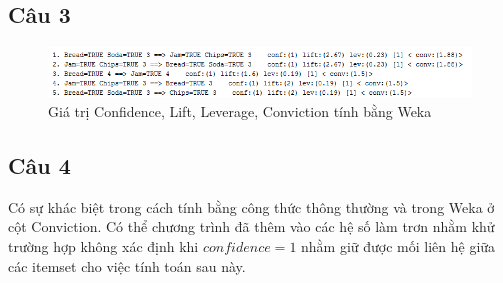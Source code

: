 \documentclass{article}
\begin{document}
\subsection{Câu 3}
\begin{figure}[H]
	\centering
	\caption{Giá trị Confidence, Lift, Leverage, Conviction tính bằng Weka}
	\includegraphics[scale = 0.8]{Measure}
\end{figure}
\subsection{Câu 4}
	Có sự khác biệt trong cách tính bằng công thức thông thường và trong Weka ở cột Conviction. Có thể chương trình đã thêm vào các hệ số làm trơn nhằm khử trường hợp không xác định khi $confidence = 1$ nhằm giữ được mối liên hệ giữa các itemset cho việc tính toán sau này.
\end{document}
